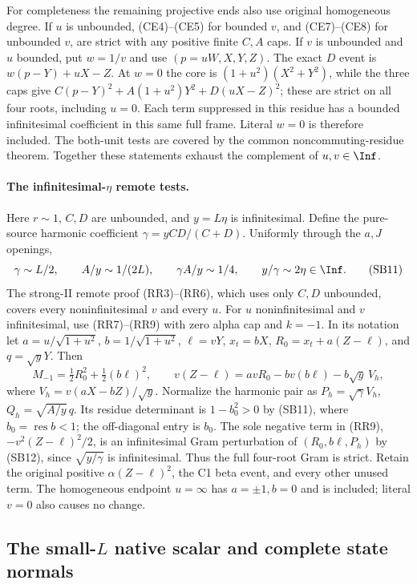 For completeness the remaining projective ends also use original
homogeneous degree. If $u$ is unbounded, (CE4)--(CE5) for bounded
$v$, and (CE7)--(CE8) for unbounded $v$, are strict with any positive
finite $C,A$ caps. If $v$ is unbounded and $u$ bounded, put
$w=1/v$ and use $(p=uW,X,Y,Z)$. The exact $D$ event is
$w(p-Y)+uX-Z$. At $w=0$ the core is
$(1+u^2)(X^2+Y^2)$, while the three caps give
$C(p-Y)^2+A(1+u^2)Y^2+D(uX-Z)^2$; these are strict on
all four roots, including $u=0$. Each term suppressed in this
residue has a bounded infinitesimal coefficient in this same
full frame. Literal $w=0$ is therefore included. The both-unit
tests are covered by the common noncommuting-residue theorem.
Together these statements exhaust the complement of $u,v\in\Inf$.

\paragraph{The infinitesimal-$\eta$ remote tests.}
Here $r\sim1$, $C,D$ are unbounded, and $y=L\eta$ is infinitesimal.
Define the pure-source harmonic coefficient
$\gamma=yCD/(C+D)$. Uniformly through the $a,J$ openings,
\[
 \gamma\sim L/2,\qquad A/y\sim1/(2L),\qquad
 \gamma A/y\sim1/4,\qquad y/\gamma\sim2\eta\in\Inf. \tag{SB11}
\]
The strong-II remote proof (RR3)--(RR6), which uses only $C,D$
unbounded, covers every noninfinitesimal $v$ and every $u$.
For $u$ noninfinitesimal and $v$ infinitesimal, use (RR7)--(RR9)
with zero alpha cap and $k=-1$. In its notation let
$a=u/\sqrt{1+u^2}$, $b=1/\sqrt{1+u^2}$,
$\ell=vY$, $x_t=bX$, $R_0=x_t+a(Z-\ell)$, and $q=\sqrt yY$.
Then
\[
 M_{-1}=\tfrac12R_0^2+\tfrac12(b\ell)^2,\qquad
 v(Z-\ell)=avR_0-bv(b\ell)-b\sqrt y\,V_h,       \tag{SB12}
\]
where $V_h=v(aX-bZ)/\sqrt y$. Normalize the harmonic pair as
$P_h=\sqrt\gamma V_h$, $Q_h=\sqrt{A/y}\,q$. Its residue
determinant is $1-b_0^2>0$ by (SB11), where $b_0=\operatorname{res}b<1$;
the off-diagonal entry is $b_0$. The sole negative term in (RR9),
$-v^2(Z-\ell)^2/2$, is an infinitesimal Gram perturbation of
$(R_0,b\ell,P_h)$ by (SB12), since $\sqrt{y/\gamma}$ is
infinitesimal. Thus the full four-root Gram is strict. Retain the
original positive $\alpha(Z-\ell)^2$, the C1 beta event, and every
other unused term. The homogeneous endpoint $u=\infty$ has
$a=\pm1,b=0$ and is included; literal $v=0$ also causes no change.



\subsection{The small-$L$ native scalar and complete state normals}

